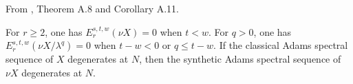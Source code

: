 \begin{theorem}
\label{sem:Literature:vanishing-and-degeneration}
From \cite{BHS}, Theorem A.8 and Corollary A.11.\par

For $r\ge2$, one has $E_r^{s,t,w}(\nu X)=0$ when $t<w$. For $q>0$, one has $E_r^{s,t,w}(\nu X/\lambda^q)=0$ when $t-w<0$ or $q\le t-w$. If the classical Adams spectral sequence of $X$ degenerates at $N$, then the synthetic Adams spectral sequence of $\nu X$ degenerates at $N$.
\end{theorem}

